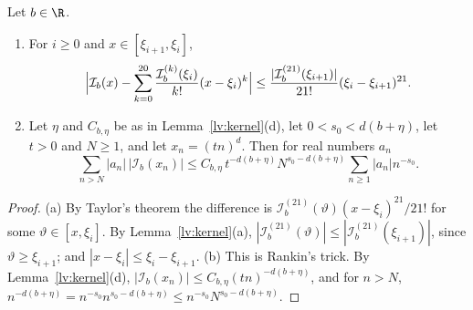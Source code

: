 \begin{lemma}\label{lv:remainders}
Let $b\in\R$.
\begin{enumerate}
\item[(a)] For $i\ge0$ and $x\in[\xi_{i+1},\xi_i]$,
 \[
  \Bigl|\mathcal I_b(x)-\sum_{k=0}^{20}\frac{\mathcal I_b^{(k)}(\xi_i)}{k!}
  (x-\xi_i)^k\Bigr|\le\frac{|\mathcal I_b^{(21)}(\xi_{i+1})|}{21!}
  (\xi_i-\xi_{i+1})^{21}.
 \]
\item[(b)] Let $\eta$ and $C_{b,\eta}$ be as in Lemma~\ref{lv:kernel}(d), let
 $0<s_0<d(b+\eta)$, let $t>0$ and $N\ge1$, and let $x_n=(tn)^d$. Then for
 real numbers $a_n$
 \[
  \sum_{n>N}|a_n|\,|\mathcal I_b(x_n)|\le C_{b,\eta}\,t^{-d(b+\eta)}
  N^{s_0-d(b+\eta)}\sum_{n\ge1}|a_n|n^{-s_0}.
 \]
\end{enumerate}
\end{lemma}

\begin{proof}
(a) By Taylor's theorem the difference is
$\mathcal I_b^{(21)}(\vartheta)(x-\xi_i)^{21}/21!$ for some $\vartheta\in[x,\xi_i]$. By
Lemma~\ref{lv:kernel}(a), $|\mathcal I_b^{(21)}(\vartheta)|\le|\mathcal
I_b^{(21)}(\xi_{i+1})|$, since $\vartheta\ge \xi_{i+1}$; and $|x-\xi_i|\le \xi_i-\xi_{i+1}$.
(b) This is Rankin's trick. By Lemma~\ref{lv:kernel}(d),
$|\mathcal I_b(x_n)|\le C_{b,\eta}(tn)^{-d(b+\eta)}$, and for $n>N$,
$n^{-d(b+\eta)}=n^{-s_0}n^{s_0-d(b+\eta)}\le n^{-s_0}N^{s_0-d(b+\eta)}$.
\end{proof}


